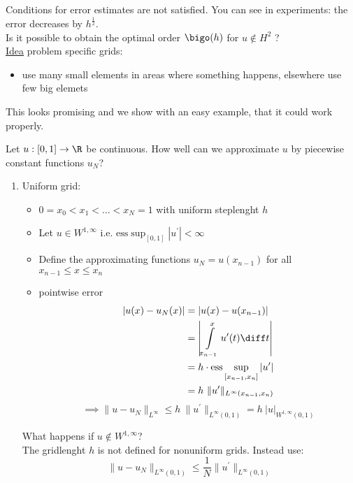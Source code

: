 
Conditions for error estimates are not satisfied. You can see in experiments: the error decreases by $h^{\frac{1}{2}}$. \\
Is it possible to obtain the optimal order $\bigo(h)$ for $u \not \in H^2$ ?\\
\underline{Idea} problem specific grids:
\begin{itemize}
	\item use many small elements in areas where something \glqq happens\grqq, elsewhere use few big elemets
\end{itemize}
This looks promising and we show with an easy example, that it could work properly.
\begin{example}
	Let $u: [0,1] \to \R $ be continuous. How well can we approximate $u$ by piecewise constant functions $u_{N}$?
	\begin{enumerate}[label = \Roman*)]
		\item Uniform grid:
			\begin{itemize}
				\item $0 = x_{0} < x_{1}< \dots < x_{N} = 1$ with uniform steplenght $h$
				\item Let $u \in W^{1,\infty}$ i.e. $\text{ess}\sup_{[0,1]} | u^\prime|< \infty$
				\item Define the approximating functions $u_{N}=u(x_{n-1})$ for all $x_{n-1}\leq x \leq x_{n}$
				\item pointwise error
					\begin{align*}
						|u(x) - u_{N}(x) | &= | u(x) - u(x_{n-1})|\\
										   &= \left| \int\limits_{x_{n-1}}^{x} u^\prime(t) \diff t \right|\\
										   &= h\cdot \text{ess}\sup_{[x_{n-1},x_{n}]}|u^\prime | \\
										   &= h\ \|u^\prime\|_{L^\infty(x_{n-1},x_{n})}
					\end{align*}
					\begin{equation*}
						\implies\|u -u_{N}\|_{L^\infty} \leq h \ \|u^\prime\|_{L^\infty(0,1)}= h \ |u|_{W^{1,\infty}(0,1)}
				\end{equation*}
			\end{itemize}
			What happens if $u \not \in W^{1,\infty}$?\\
			The gridlenght $h$ is not defined for nonuniform grids. Instead use:
			\begin{equation*}
				\|u-u_{N}\|_{L^{\infty}(0,1)}  \leq \frac{1}{N} \|u^\prime\|_{L^\infty(0,1)}
			\end{equation*}

\end{enumerate}
\end{example}
